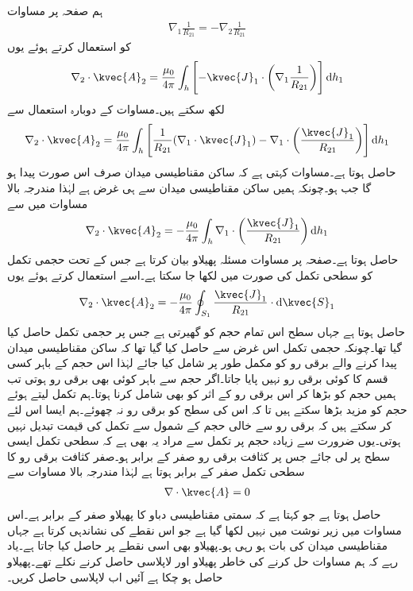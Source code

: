 ہم صفحہ  پر مساوات 
\begin{align*}
\nabla_1 \frac{1}{R_{21}}=-\nabla_2 \frac{1}{R_{21}}
\end{align*}
کو استعمال کرتے ہوئے یوں 
\begin{align}
\nabla_2 \cdot \kvec{A}_2=\frac{\mu_0}{4\pi}\int_h \left[-\kvec{J}_1 \cdot \left(\nabla_1 \frac{1}{R_{21}}\right)\right] \dif h_1
\end{align}
لکھ سکتے ہیں۔مساوات  کے دوبارہ استعمال سے 
\begin{align}
\nabla_2 \cdot \kvec{A}_2=\frac{\mu_0}{4\pi}\int_h \left[\frac{1}{R_{21}} (\nabla_1 \cdot \kvec{J}_1)-\nabla_1 \cdot \left(\frac{\kvec{J}_1}{R_{21}} \right)\right] \dif h_1
\end{align}
حاصل ہوتا ہے۔مساوات  کہتی ہے کہ ساکن مقناطیسی میدان صرف اس صورت پیدا ہو گا جب  ہو۔چونکہ ہمیں ساکن مقناطیسی میدان سے ہی غرض ہے لہٰذا مندرجہ بالا مساوات میں سے
\begin{align}
\nabla_2 \cdot \kvec{A}_2=-\frac{\mu_0}{4\pi}\int_h \nabla_1 \cdot \left(\frac{\kvec{J}_1}{R_{21}} \right) \dif h_1
\end{align}
حاصل ہوتا ہے۔صفحہ  پر مساوات  مسئلہ پھیلاو بیان کرتا ہے جس کے تحت حجمی تکمل کو سطحی تکمل کی صورت میں لکھا جا سکتا ہے۔اسے استعمال کرتے ہوئے یوں
\begin{align}
\nabla_2 \cdot \kvec{A}_2=-\frac{\mu_0}{4\pi}\oint_{S_1} \frac{\kvec{J}_1}{R_{21}} \cdot \dif \kvec{S}_1
\end{align}
حاصل ہوتا ہے جہاں سطح  اس تمام حجم کو گھیرتی ہے جس پر حجمی تکمل حاصل کیا گیا تھا۔چونکہ حجمی تکمل اس غرض سے حاصل کیا گیا تھا کہ ساکن مقناطیسی میدان پیدا کرنے والے برقی رو کو مکمل طور پر شامل کیا جائے  لہٰذا اس حجم کے باہر کسی قسم کا کوئی برقی رو نہیں پایا جاتا۔اگر حجم سے باہر کوئی بھی برقی رو ہوتی تب ہمیں حجم کو بڑھا کر اس برقی رو کے اثر کو بھی شامل کرنا ہوتا۔ہم تکمل لیتے ہوئے حجم کو مزید بڑھا سکتے ہیں تا کہ اس کی سطح کو برقی رو نہ چھوئے۔ہم ایسا اس لئے کر سکتے ہیں کہ برقی رو سے خالی حجم کے شمول سے تکمل کی قیمت تبدیل نہیں ہوتی۔یوں ضرورت سے زیادہ حجم پر تکمل سے مراد یہ بھی ہے کہ سطحی تکمل ایسی سطح پر لی جائے جس پر کثافت برقی رو صفر کے برابر ہو۔صفر کثافت برقی رو کا سطحی تکمل صفر کے برابر ہوتا ہے لہٰذا مندرجہ بالا مساوات سے
\begin{align}\label{مساوات_مقناطیسی_سمتی_مقناطیسی_دباو_کی_پھیلاو_صفر_ہے}
\nabla \cdot \kvec{A}=0
\end{align}
حاصل ہوتا ہے جو کہتا ہے کہ سمتی مقناطیسی دباو کا پھیلاو صفر کے برابر ہے۔اس مساوات میں زیر نوشت میں  نہیں لکھا گیا ہے جو اس نقطے کی نشاندہی کرتا ہے جہاں مقناطیسی میدان کی بات ہو رہی ہو۔پھیلاو بھی اسی نقطے پر حاصل کیا جاتا ہے۔یاد رہے کہ ہم مساوات  حل کرنے کی خاطر پھیلاو اور لاپلاسی حاصل کرنے نکلے تھے۔پھیلاو حاصل ہو چکا ہے آئیں اب لاپلاسی حاصل کریں۔  

